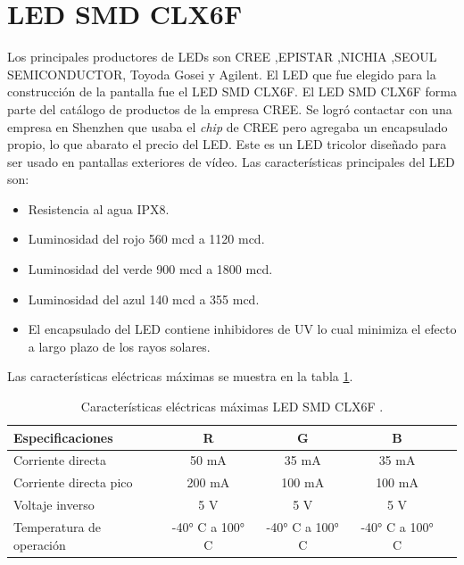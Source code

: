 \section{LED SMD CLX6F}
Los principales productores de LEDs son CREE ,EPISTAR ,NICHIA ,SEOUL SEMICONDUCTOR, Toyoda Gosei y Agilent.
El LED que fue elegido para la construcción de la pantalla fue el LED SMD CLX6F. El LED SMD CLX6F forma parte del catálogo de productos de la empresa CREE. Se logró contactar con una empresa en Shenzhen que usaba el \textit{chip} de CREE pero agregaba un encapsulado propio, lo que abarato el precio del LED. Este es un LED tricolor diseñado para ser usado en pantallas exteriores de vídeo. Las características principales del LED son:
\begin{itemize}
\item Resistencia al agua IPX8.
\item Luminosidad del rojo 560 mcd a 1120 mcd.
\item Luminosidad del verde 900 mcd a 1800 mcd.
\item Luminosidad del azul 140 mcd a 355 mcd.
\item El encapsulado del LED contiene inhibidores de UV lo cual minimiza el efecto a largo plazo de los rayos solares.
\end{itemize}

Las características eléctricas máximas se muestra en la tabla \ref{tab:MAXLEDCLX6F}.


\begin{table}[h]
\centering
\caption[Características eléctricas máximas LED CLX6F]{Características eléctricas máximas LED SMD CLX6F \protect\footnotemark.}
\begin{tabular}{l c c c c}
\toprule
\textbf{Especificaciones}& \textbf{R} & \textbf{G} & \textbf{B}\\
\midrule 


Corriente directa &50 mA &35 mA &35 mA\\
Corriente directa pico &200 mA &100 mA &100 mA \\
Voltaje inverso &5 V &5 V &5 V\\
Temperatura de operación &-40\si{\degree} C a 100\si{\degree} C  &-40\si{\degree} C a 100\si{\degree} C  &-40\si{\degree} C a 100\si{\degree} C\\


\bottomrule
\hline
\end{tabular}
\label{tab:MAXLEDCLX6F}
\end{table}




